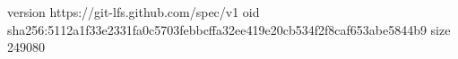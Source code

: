 version https://git-lfs.github.com/spec/v1
oid sha256:5112a1f33e2331fa0c5703febbcffa32ee419e20cb534f2f8caf653abe5844b9
size 249080
